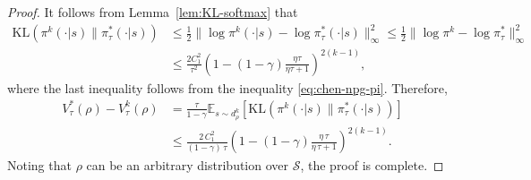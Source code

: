 \begin{proof}
It follows from Lemma~\ref{lem:KL-softmax} that 
\begin{align*}
\mathrm{KL}(\pi^k(\cdot|s)\|\pi_\tau^*(\cdot|s))&\leq \frac{1}{2}\|\log\pi^k(\cdot|s)-\log\pi_\tau^*(\cdot|s)\|_\infty^2\leq \frac{1}{2}\|\log\pi^k-\log\pi_\tau^*\|_\infty^2\\
&\leq\frac{2C_1^2}{\tau^2}\left( 1-\left( 1-\gamma \right) \frac{\eta \tau}{\eta \tau +1} \right) ^{2(k-1)},
\end{align*}
where the last inequality follows from the inequality \eqref{eq:chen-npg-pi}. Therefore,
\begin{align*}
V_\tau^*(\rho)-V^k_\tau(\rho) & = \frac{\tau}{1-\gamma}\mathbb{E}_{s\sim d_\rho^k}\left[\mathrm{KL}\left(\pi^k(\cdot|s)\|\pi_\tau^*(\cdot|s)\right)\right]\\
&\leq \frac{2\,C_1^2}{(1-\gamma)\,\tau}\left( 1-\left( 1-\gamma \right) \frac{\eta\,\tau}{\eta \,\tau +1} \right) ^{2(k-1)}.
\end{align*}
Noting that $\rho$ can be an arbitrary distribution over $\mathcal{S}$, the proof is complete.
\end{proof}



